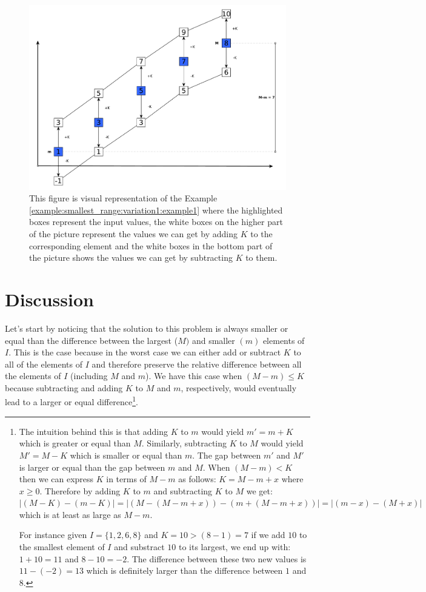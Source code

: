 	\begin{figure}
		\centering
		\includegraphics[width=1\linewidth]{sources/smallest_range/images/bars}
		\caption{This figure is visual representation of the Example \ref{example:smallest_range:variation1:example1}
		where the highlighted boxes represent the input values, the white boxes on the higher part of
		the picture represent the values we can get by adding $K$ to the corresponding element and the
		white boxes in the bottom part of the picture shows the values we can get by subtracting $K$ to
		them.}
		\label{fig:smallest_range:bars_full}
	\end{figure}

\section{Discussion}
\label{smallest_range:sec:discussion}
Let's start by noticing that the solution to this problem is always smaller or equal than the
difference between the largest ($M)$ and smaller  $(m)$ elements of $I$. This is the case because in
the worst case we can either add or subtract $K$ to all of the elements of $I$ and therefore
preserve the relative difference between all the elements of $I$ (including $M$ and $m$). We have
this case when $(M-m) \leq K$ because subtracting and adding $K$ to $M$ and $m$, respectively, would
eventually lead to a larger or equal difference\footnote{The intuition behind this is that adding
$K$ to $m$ would yield $m' = m+K$ which is greater or equal than $M$. Similarly, subtracting $K$ to
$M$ would yield $M' = M-K$ which is smaller or equal than $m$. The gap between $m'$ and $M'$ is
larger or equal than the gap between $m$ and $M$. When $(M-m) < K$ then we can express $K$ in terms
of $M-m$ as follows: $K = M-m + x$ where $x \geq 0$. Therefore by adding $K$ to $m$ and subtracting
$K$ to $M$ we get: $|(M-K) - (m-K)| = |(M-(M-m + x)) - (m + (M-m + x))| = |(m-x) - (M+x)|$ which is
at least as large as $M-m$.

For instance given $I = \{1,2,6,8\}$ and $K = 10 > (8-1) = 7$ if we add $10$ to the smallest element
of $I$ and substract $10$ to its largest, we end up with: $1+10 = 11$ and $8-10=-2$. The difference
between these two new values is $11-(-2) = 13$ which is definitely larger than the difference
between $1$ and $8$.}.

